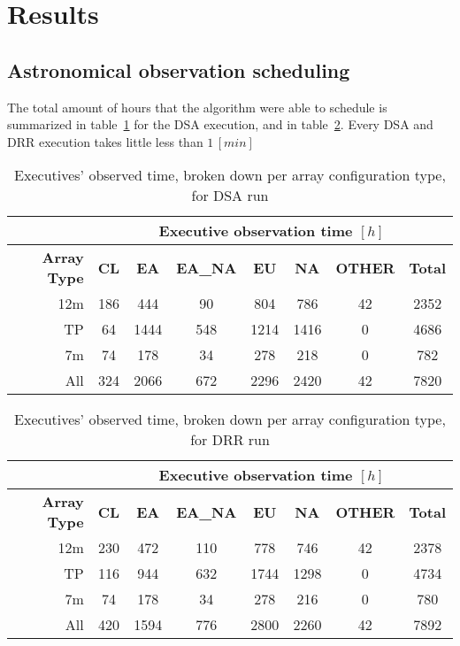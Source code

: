 \newpage
\section{Results}

\subsection{Astronomical observation scheduling}

The total amount of hours that the algorithm were able to schedule is summarized in table~\ref{table:dsa-hours-per-array} for the DSA execution, and in table~\ref{table:drr-hours-per-array}. Every DSA and DRR execution takes little less than $1\,[min]$

\begin{table}[h!]
\centering
\begin{tabular}{c|c|c|c|c|c|c|c|} 
\cline{2-8}
 & \multicolumn{7}{c|}{\textbf{Executive observation time $[h]$}} \\ \hline
\multicolumn{1}{|r|}{\textbf{Array Type}} & \textbf{CL}	& \textbf{EA} & \textbf{EA\_NA} & \textbf{EU} & \textbf{NA} & \textbf{OTHER} & \textbf{Total} \\ \hline
\multicolumn{1}{|r|}{12m} & 186 & 444 & 90 & 804 & 786 & 42 & 2352 \\ \hline
\multicolumn{1}{|r|}{TP} & 64 & 1444 & 548 & 1214 & 1416 & 0 & 4686 \\ \hline
\multicolumn{1}{|r|}{7m} & 74 & 178 & 34 & 278 & 218 & 0 & 782 \\ \hline
\multicolumn{1}{|r|}{All} & 324 & 2066 & 672 & 2296 & 2420 & 42 & 7820 \\ \hline
\end{tabular}
\caption{Executives' observed time, broken down per array configuration type, for DSA run}
\label{table:dsa-hours-per-array}
\end{table}

\begin{table}[h!]
\centering
\begin{tabular}{c|c|c|c|c|c|c|c|} 
\cline{2-8}
 & \multicolumn{7}{c|}{\textbf{Executive observation time $[h]$}} \\ \hline
 \multicolumn{1}{|r|}{\textbf{Array Type}} & \textbf{CL}	& \textbf{EA} & \textbf{EA\_NA} & \textbf{EU} & \textbf{NA} & \textbf{OTHER} & \textbf{Total} \\ \hline
 \multicolumn{1}{|r|}{12m} &	230 & 	472 &	110 &	778 & 	746 &	42 & 2378 \\ \hline
 \multicolumn{1}{|r|}{TP} & 116 & 944 & 632 &	1744 &	1298 & 	0 &	4734 \\ \hline
 \multicolumn{1}{|r|}{7m} & 74	& 178 & 34 & 278 & 216 & 0 & 780 \\ \hline
 \multicolumn{1}{|r|}{All} & 420 & 1594 & 776 & 2800 & 2260 & 42 & 7892 \\ \hline
\end{tabular}
\caption{Executives' observed time, broken down per array configuration type, for DRR run}
\label{table:drr-hours-per-array}
\end{table}

